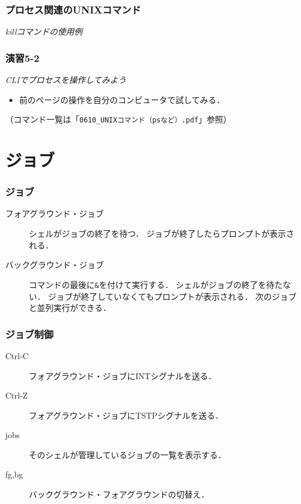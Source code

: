 \documentclass{beamer}                 %
\begin{document}
\begin{frame}[fragile]
  \frametitle{プロセス関連のUNIXコマンド}
  \emph{killコマンドの使用例}
\end{frame}

\begin{frame}[fragile]
  \frametitle{演習5-2}
  \emph{CLIでプロセスを操作してみよう}
\begin{itemize}
\item 前のページの操作を自分のコンピュータで試してみる．
\end{itemize}
  （コマンド一覧は「\texttt{0610\_UNIXコマンド（psなど）.pdf}」参照）
\end{frame}

\section{ジョブ}
\begin{frame}[fragile]
  \frametitle{ジョブ}
  \begin{description}
  \item[フォアグラウンド・ジョブ]
    シェルがジョブの終了を待つ．
    ジョブが終了したらプロンプトが表示される．

  \item[バックグラウンド・ジョブ]
    コマンドの最後に\texttt{\&}を付けて実行する．
    シェルがジョブの終了を待たない．
    ジョブが終了していなくてもプロンプトが表示される．
    次のジョブと並列実行ができる．
  \end{description}
\end{frame}

\begin{frame}[fragile]
  \frametitle{ジョブ制御}
  \begin{description}
  \item[Ctrl-C] フォアグラウンド・ジョブにINTシグナルを送る．
  \item[Ctrl-Z] フォアグラウンド・ジョブにTSTPシグナルを送る．
  \item[jobs] そのシェルが管理しているジョブの一覧を表示する．
  \item[fg,bg] バックグラウンド・フォアグラウンドの切替え．
  \end{description}
\end{frame}
\end{document}
